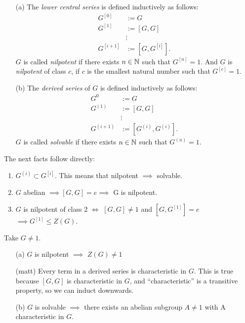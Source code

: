\documentclass[11pt,leqno,oneside]{amsart}
\begin{document}
\begin{defn*}[1.3.1]
  \begin{enumerate}
  \item[(a)] The \emph{lower central series} is defined inductively as follows:
    \begin{align*}
      G^{[0]} &:= G\\
      G^{[1]} &:= [G,G]\\
      &\vdots\\
      G^{[i+1]} &:= [G,G^{[i]}].
    \end{align*}
    \(G\) is called \emph{nilpotent} if there exists \(n \in {\mathbb N}\) such that \(G^{[n]}=1\). And \(G\) is \emph{nilpotent}
    of class \(c\), if \(c\) is the smallest natural number such that \(G^{[c]}=1\).
  \item[(b)] The \emph{derived series} of \(G\) is defined inductively as follows:
    \begin{align*}
      G^{{0}} &:= G\\
      G^{(1)} &:= [G,G]\\
      &\vdots\\
      G^{(i+1)} &:= [G^{(i)},G^{(i)}].
    \end{align*}
    \(G\) is called \emph{solvable} if there exists \(n \in {\mathbb N}\) such that \(G^{(n)}=1\).
  \end{enumerate}
\end{defn*}
\begin{rmk*}[1.3.2]
  The next facts follow directly:
  \begin{enumerate}
  \item \(G^{(i)} \subset G^{[i]}\). This means that nilpotent \(\implies\) solvable.
  \item \(G\) abelian \(\implies [G,G]=e \implies \) G is nilpotent.
  \item \(G\) is nilpotent of class \(2\) \(\iff\) \([G,G] \neq 1\) and \([G,G^{[1]}]=e\) \(\implies G^{[1]} \le Z(G)\).
  \end{enumerate}
\end{rmk*}

\begin{lem*}[1.3.3]
  Take \(G \neq 1\).
  \begin{enumerate}
  \item[(a)] \(G\) is nilpotent \(\implies\) \(Z(G) \neq 1\)
  \item[(matt)] Every term in a derived series is characteristic in $G$.  This is true because $[G,G]$ is characteristic in $G$, and ``characteristic'' is a transitive property, so we can induct downwards.
  \item[(b)] \(G\) is solvable \(\implies\) there exists an abelian subgroup \(A \neq 1\) with A characteristic in \(G\).
  \end{enumerate}
\end{lem*}
\end{document}
